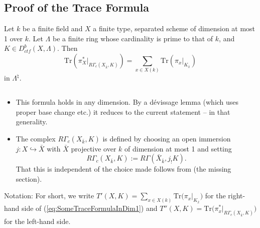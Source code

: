 
\subsection{Proof of the Trace Formula}

\begin{theorem} \label{thm:SomeTraceFormulaInDim1}
Let $k$ be a finite field and $X$ a finite type, separated scheme of dimension at most 1 over $k$. Let $\Lambda$ be a finite ring whose cardinality is prime to that of $k$, and $K\in D_{ctf}^b(X, \Lambda)$. Then
\begin{equation} \label{eq:SomeTraceFormulaInDim1}
\text{Tr}\left(\pi_X^*\big|_{R\Gamma_c(X_{\bar k}, K)}\right) = \sum_{x\in X(k)} \text{Tr}\left(\pi_x\big|_{K_{\bar x}}\right)
\end{equation}
in $\Lambda^{\natural}$. 
\end{theorem}

\begin{remark} $ $
\begin{itemize}
\item 
This formula holds in any dimension. By a d\'evissage lemma (which uses proper base change etc.) it reduces to the current statement -- in that generality.
\item 
The complex $R\Gamma_c(X_{\bar k}, K)$ is defined by choosing an open immersion $j: X \hookrightarrow \bar X$ with $\bar X$ projective over $k$ of dimension at most 1 and setting
$$
R\Gamma_c(X_{\bar k}, K) := R\Gamma(\bar X_{\bar k}, j_!K).
$$
That this is independent of the choice made follows from (the missing section).
\end{itemize}
\end{remark}

Notation:
For short, we write $T'(X, K) = \sum_{x\in X(k)} \text{Tr}\big(\pi_x\big|_{K_{\bar x}}\big)$ for the right-hand side of (\ref{eq:SomeTraceFormulaInDim1}) and $T''(X, K) =\text{Tr}\big(\pi_x^*\big|_{R\Gamma_c(X_{\bar k}, K)}\big)$ for the left-hand side.


